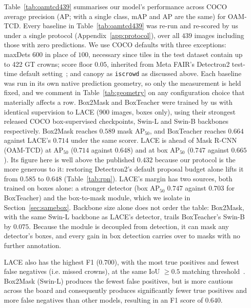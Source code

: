 \documentclass[remotesensing,article,submit,moreauthors]{Definitions/mdpi}
\begin{document}
Table~\ref{tab:oamtcd439} summarises our model's performance across COCO average precision (AP; with a single class, mAP and AP are the same) for OAM-TCD. Every baseline in Table~\ref{tab:oamtcd439} was re-run and re-scored by us under a single protocol (Appendix~\ref{app:protocol}), over all $439$ images including those with zero predictions. We use COCO defaults with three exceptions: maxDets $600$ in place of $100$, necessary since tiles in the test dataset contain up to 422 GT crowns; score floor $0.05$, inherited from Meta FAIR's Detectron2 test-time default setting~\cite{detectron2}; and canopy as \texttt{iscrowd} as discussed above.  Each baseline was run in its own native prediction geometry, so only the measurement is held fixed, and we comment in Table~\ref{tab:geometry} on any configuration choice that materially affects a row. Box2Mask and BoxTeacher were trained by us with identical supervision to LACE ($900$ images, boxes only), using their strongest released COCO box-supervised checkpoints, Swin-L and Swin-B backbones respectively. Box2Mask reaches $0.589$ mask AP$_{50}$, and BoxTeacher reaches $0.664$ against LACE's $0.714$ under the same scorer. LACE is ahead of Mask R-CNN (OAM-TCD) at AP$_{50}$ ($0.714$ against $0.648$) and at box AP$_{50}$ ($0.747$ against $0.665$). Its figure here is well above the published $0.432$ because our protocol is the more generous to it: restoring Detectron2's default proposal budget alone lifts it from $0.585$ to $0.648$ (Table~\ref{tab:rpn}). LACE's margin has two sources, both trained on boxes alone: a stronger detector (box AP$_{50}$ $0.747$ against $0.703$ for BoxTeacher) and the box-to-mask module, which we isolate in Section~\ref{sec:samebox}. Backbone size alone does not order the table: Box2Mask, with the same Swin-L backbone as LACE's detector, trails BoxTeacher's Swin-B by $0.075$. Because the module is decoupled from detection, it can mask any detector's boxes, and every gain in box detection carries over to masks with no further annotation.

LACE also has the highest F1 ($0.700$), with the most true positives and fewest false negatives (i.e. missed crowns), at the same IoU $\geq 0.5$ matching threshold~\cite{ball2023,weinstein2020,hao2021,plesoianu2020}. Box2Mask (Swin-L) produces the fewest false positives, but is more cautious across the board and consequently produces significantly fewer true positives and more false negatives than other models, resulting in an F1 score of $0.640$.
\end{document}
